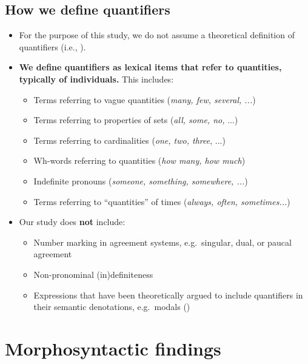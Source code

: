 \documentclass{article}
\begin{document}
    \subsection{How we define quantifiers}
\begin{itemize}
    \item For the purpose of this study, we do not assume a theoretical definition of quantifiers (i.e., \citealt{heimkratzer98}).
    \item {\bf We define quantifiers as lexical items that refer to quantities, typically of individuals.}  This includes:
    

    
\begin{itemize}
        \item Terms referring to vague quantities ({\it many, few, several, ...})
        \item Terms referring to properties of sets ({\it all, some, no,} ...)
        \item Terms referring to cardinalities ({\it one, two, three}, ...)
        \item Wh-words referring to quantities  ({\it how many, how much})
        \item Indefinite pronouns ({\it someone, something, somewhere, ...})
        \item Terms referring to ``quantities'' of times ({\it always, often, sometimes...})
\end{itemize}
    \item Our study does {\bf not} include:
\begin{itemize}
    \item Number marking in agreement systems, e.g.\ singular, dual, or paucal agreement
    \item Non-pronominal (in)definiteness
    \item Expressions that have been theoretically argued to include quantifiers in their semantic denotations, e.g.\ modals (\citealt{heimkratzer98})
\end{itemize}
\end{itemize}


\section{Morphosyntactic findings}
\label{sec:mpsfind}
\end{document}
